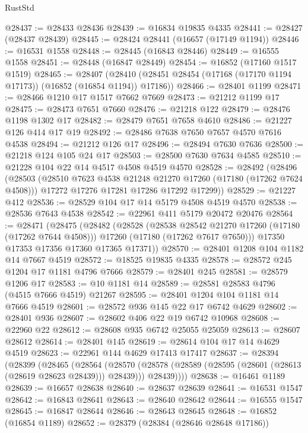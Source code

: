 \begin{lexlean}{RustStd}
\begin{coremodule}
{\begin{coremodule}
{{{{{{{{{{{{{{{{{{{{{{{{{{{{{{{{{{{{{{{{{{{{{{{{{{{{{{{@28437 := @28433 @28436
@28439 := @16834 @19835 @4335
@28441 := @28427 (@28437 @28439)
@28445 := @28424 @28441 (@16657 (@17149 @1194))
@28446 := @16531 @1558
@28448 := @28445 (@16843 @28446)
@28449 := @16555 @1558
@28451 := @28448 (@16847 @28449)
@28454 := @16852 (@17160 @1517 @1519)
@28465 := @28407
    (@28410 (@28451 @28454 (@17168 (@17170 @1194 @17173)) (@16852 (@16854 @1194)) @17186))
@28466 := @28401 @1199
@28471 := @28466 @1210 @17 @1517 @7662 @7669
@28473 := @21212 @1199 @17
@28475 := @28473 @7651 @7660
@28476 := @21218 @122
@28479 := @28476 @1198 @1302 @17
@28482 := @28479 @7651 @7658 @4610
@28486 := @21227 @126 @414 @17 @19
@28492 := @28486 @7638 @7650 @7657 @4570 @7616 @4538
@28494 := @21212 @126 @17
@28496 := @28494 @7630 @7636
@28500 := @21218 @124 @105 @24 @17
@28503 := @28500 @7630 @7634 @4585
@28510 := @21228 @104 @22 @14 @4517 @4508 @4519 @4570
@28528 := @28492
    (@28496
      (@28503
        (@28510 @7623 @4538 @21248 @21270 @17260 (@17180 (@17262 @7624 @4508)))
        @17272
        @17276
        @17281
        @17286
        @17292
        @17299))
@28529 := @21227 @412
@28536 := @28529 @104 @17 @14 @5179 @4508 @4519 @4570
@28538 := @28536 @7643 @4538
@28542 := @22961 @411 @5179 @20472 @20476
@28564 := @28471
    (@28475
      (@28482
        (@28528
          (@28538 @28542 @21270 @17260 (@17180 (@17262 @7644 @4508)))
          @17260
          (@17180 (@17262 @7617 @7650)))
        @17350
        @17353
        @17356
        @17360
        @17365
        @17371))
@28570 := @28401 @1208 @104 @1182 @14 @7667 @4519
@28572 := @18525 @19835 @4335
@28578 := @28572 @245 @1204 @17 @1181 @4796 @7666
@28579 := @28401 @245
@28581 := @28579 @1206 @17
@28583 := @10 @1181 @14
@28589 := @28581 @28583 @4796 (@4515 @7666 @4519) @21267
@28595 := @28401 @1204 @104 @1181 @14 @7666 @4519
@28601 := @28572 @936 @145 @22 @17 @6742 @4629
@28602 := @28401 @936
@28607 := @28602 @406 @22 @19 @6742 @10968
@28608 := @22960 @22
@28612 := @28608 @935 @6742 @25055 @25059
@28613 := @28607 @28612
@28614 := @28401 @145
@28619 := @28614 @104 @17 @14 @4629 @4519
@28623 := @22961 @144 @4629 @17413 @17417
@28637 := @28394
    (@28399
      (@28465
        (@28564
          (@28570
            (@28578 (@28589 (@28595 (@28601 (@28613 (@28619 @28623 @28439))) @28439)))
            @28439))))
@28638 := @16461 @1189
@28639 := @16657 @28638
@28640 := @28637 @28639
@28641 := @16531 @1547
@28642 := @16843 @28641
@28643 := @28640 @28642
@28644 := @16555 @1547
@28645 := @16847 @28644
@28646 := @28643 @28645
@28648 := @16852 (@16854 @1189)
@28652 := @28379 (@28384 (@28646 @28648 @17186))
}}}}}}}}}}}}}}}}}}}}}}}}}}}}}}}}}}}}}}}}}}}}}}}}}}}}}}}
\end{coremodule}}
\end{coremodule}
\end{lexlean}
